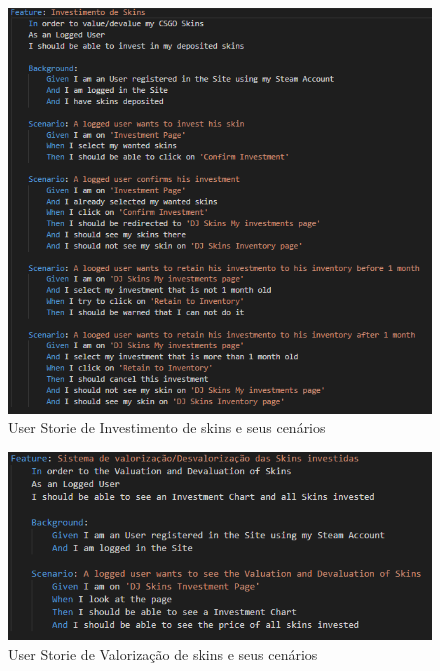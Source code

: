 \documentclass[
    12pt,               %
    openright,          %
    oneside,
    a4paper,            %
    MODELO,             %
    TODO,               %
    english,            %
    brazil              %
    ]{ifsp-spo-inf-ctds} %
\begin{document}
\begin{apendicesenv}
	\begin{figure}[!htb]
		\centering
		\includegraphics[scale=0.9]{Imagens/InvestimentoSkins.png}
		\caption{User Storie de Investimento de skins e seus cenários}
	\end{figure}
	
	\begin{figure}[!htb]
		\centering
		\includegraphics[scale=0.9]{Imagens/Valorizacao.png}
		\caption{User Storie de Valorização de skins e seus cenários}
	\end{figure}
	

\end{apendicesenv}
\end{document}
